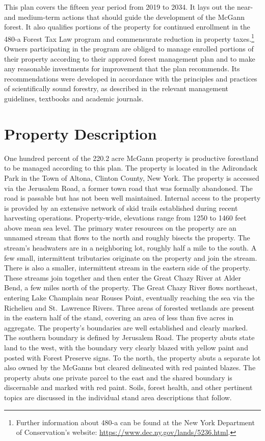 \documentclass[]{tufte-handout}
\begin{document}
This plan covers the fifteen year period from 2019 to 2034. It lays out
the near- and medium-term actions that should guide the development of
the McGann forest. It also qualifies portions of the property for
continued enrollment in the 480-a Forest Tax Law program and
commensurate reduction in property taxes.\footnote{Further information
  about 480-a can be found at the New York Department of Conservation's
  website: \url{https://www.dec.ny.gov/lands/5236.html}. \vspace{20pt}}
Owners participating in the program are obliged to manage enrolled
portions of their property according to their approved forest management
plan and to make any reasonable investments for improvement that the
plan recommends. Its recommendations were developed in accordance with
the principles and practices of scientifically sound forestry, as
described in the relevant management guidelines, textbooks and academic
journals.

\section{Property Description}\label{property-description}

One hundred percent of the 220.2 acre McGann property is productive
forestland to be managed according to this plan. The property is located
in the Adirondack Park in the Town of Altona, Clinton County, New York.
The property is accessed via the Jerusalem Road, a former town road that
was formally abandoned. The road is passable but has not been well
maintained. Internal access to the property is provided by an extensive
network of skid trails established during recent harvesting operations.
Property-wide, elevations range from 1250 to 1460 feet above mean sea
level. The primary water resources on the property are an unnamed stream
that flows to the north and roughly bisects the property. The stream's
headwaters are in a neighboring lot, roughly half a mile to the south. A
few small, intermittent tributaries originate on the property and join
the stream. There is also a smaller, intermittent stream in the eastern
side of the property. These streams join together and then enter the
Great Chazy River at Alder Bend, a few miles north of the property. The
Great Chazy River flows northeast, entering Lake Champlain near Rouses
Point, eventually reaching the sea via the Richelieu and St.~Lawrence
Rivers. Three areas of forested wetlands are present in the eastern half
of the stand, covering an area of less than five acres in aggregate. The
property's boundaries are well established and clearly marked. The
southern boundary is defined by Jerusalem Road. The property abuts state
land to the west, with the boundary very clearly blazed with yellow
paint and posted with Forest Preserve signs. To the north, the property
abuts a separate lot also owned by the McGanns but cleared delineated
with red painted blazes. The property abuts one private parcel to the
east and the shared boundary is discernable and marked with red paint.
Soils, forest health, and other pertinent topics are discussed in the
individual stand area descriptions that follow.
\end{document}
